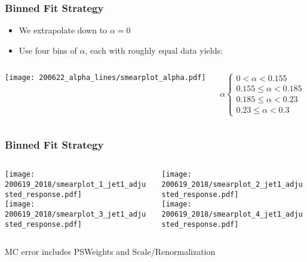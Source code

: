 \documentclass{beamer}
\begin{document}
\begin{frame}
  \frametitle{Binned Fit Strategy}

  \begin{itemize}
  \item We extrapolate down to $\alpha = 0$
  \item Use four bins of $\alpha$, each with roughly equal data yields:
  \end{itemize}
  \begin{columns}
    \begin{column}{0.5\linewidth}
      \texttt{[image: 200622\_alpha\_lines/smearplot\_alpha.pdf]}
    \end{column}
    \begin{column}{0.5\linewidth}
      \[
      \alpha
      \begin{cases}
        0 < \alpha < 0.155 \\
        0.155 \le \alpha < 0.185 \\
        0.185 \le \alpha < 0.23 \\
        0.23 \le \alpha < 0.3
      \end{cases}
      \]
    \end{column}
  \end{columns}

\end{frame}


\begin{frame}
  \frametitle{Binned Fit Strategy}

  \begin{columns}
    \begin{column}{0.3\linewidth}
      \centering
      \texttt{[image: 200619\_2018/smearplot\_1\_jet1\_adjusted\_response.pdf]} \\
      \texttt{[image: 200619\_2018/smearplot\_3\_jet1\_adjusted\_response.pdf]}
    \end{column}
    \begin{column}{0.3\linewidth}
      \centering
      \texttt{[image: 200619\_2018/smearplot\_2\_jet1\_adjusted\_response.pdf]} \\
      \texttt{[image: 200619\_2018/smearplot\_4\_jet1\_adjusted\_response.pdf]}
    \end{column}
  \end{columns}

  \vfill
  MC error includes PSWeights and Scale/Renormalization

\end{frame}
\end{document}
